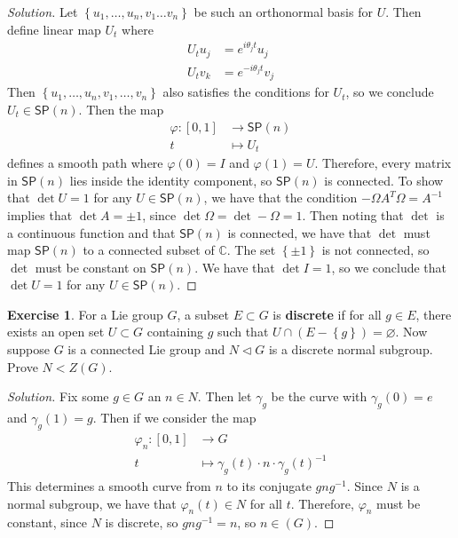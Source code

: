 \documentclass[psamsfonts]{amsart}
\theoremstyle{definition}
\newtheorem{exer}[thm]{Exercise}
\theoremstyle{remark}
\renewcommand{\emptyset}{\varnothing}
\newcommand{\C}{\mathbb{C}}
\newcommand{\SP}{\mathsf{SP}}
\newcommand{\inv}{^{-1}}
\newcommand{\set}[1]{\left\lbrace#1 \right\rbrace}
\begin{document}
\begin{proof}[Solution]
Let $\set{u_1, \ldots ,u_n, v_1 \ldots v_n}$ be such an orthonormal basis for $U$. Then define linear map $U_t$ where 
\begin{align*}
U_tu_j &= e^{i\theta_jt}u_j \\
U_tv_k &= e^{-i\theta_jt}v_j
\end{align*}
Then $\set{u_1, \ldots, u_n, v_1, \ldots, v_n}$ also satisfies the conditions for $U_t$, so we conclude $U_t \in \SP(n)$. Then the map
\begin{align*}
\varphi: [0,1] &\to \SP(n) \\
t &\mapsto U_t
\end{align*} 
defines a smooth path where $\varphi(0) = I$ and $\varphi(1) = U$. Therefore, every matrix in $\SP(n)$ lies inside the identity component, so $\SP(n)$ is connected. To show that $\det U = 1$ for any $U \in \SP(n)$, we have that the condition $-\Omega A^T \Omega  = A\inv$ implies that $\det A = \pm 1$, since $\det \Omega = \det -\Omega =1$. Then noting that $\det$ is a continuous function and that $\SP(n)$ is connected, we have that $\det$ must map $\SP(n)$ to a connected subset of $\C$. The set $\set{\pm 1}$ is not connected, so $\det$ must be constant on $\SP(n)$. We have that $\det I = 1$, so we conclude that $\det U = 1$ for any $U \in \SP(n)$.
\end{proof}

\setcounter{thm}{10}
\begin{exer}
For a  Lie group $G$, a subset $E \subset G$ is \textbf{discrete} if for all $g \in E$, there exists an open set $U \subset G$ containing $g$ such that $U \cap (E -  \set{g}) = \emptyset$. Now suppose $G$ is a connected Lie group and $N \triangleleft G$ is a discrete normal subgroup. Prove $N < Z(G)$.
\end{exer}

\begin{proof}[Solution]
Fix some $g\in G$ an $n \in N$. Then let $\gamma_g$ be the curve with $\gamma_g(0) = e$ and $\gamma_g(1) = g$. Then if we consider the map
\begin{align*}
\varphi_n: [0,1] &\to G \\
t &\mapsto \gamma_g(t)\cdot n \cdot \gamma_g(t)\inv
\end{align*}
This determines a smooth curve from $n$ to its conjugate $gng\inv$. Since $N$ is a normal subgroup, we have that $\varphi_n(t) \in N$ for all $t$. Therefore, $\varphi_n$ must be constant, since $N$ is discrete, so $gng\inv = n$, so $n \in (G)$.
\end{proof}
\end{document}
